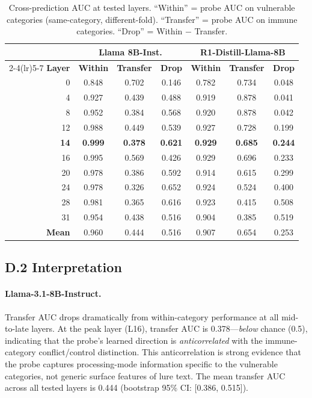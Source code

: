 \documentclass{article}
\begin{document}
\begin{table}[ht]
\centering
\caption{Cross-prediction AUC at tested layers.  ``Within'' = probe
  AUC on vulnerable categories (same-category, different-fold).
  ``Transfer'' = probe AUC on immune categories.  ``Drop'' =
  Within $-$ Transfer.}
\label{tab:cross_pred_full}
\vspace{4pt}
\small
\begin{tabular}{rcccccc}
\toprule
& \multicolumn{3}{c}{\textbf{Llama 8B-Inst.}} & \multicolumn{3}{c}{\textbf{R1-Distill-Llama-8B}} \\
\cmidrule(lr){2-4}\cmidrule(lr){5-7}
\textbf{Layer} & \textbf{Within} & \textbf{Transfer} & \textbf{Drop} & \textbf{Within} & \textbf{Transfer} & \textbf{Drop} \\
\midrule
 0 & 0.848 & 0.702 & 0.146 & 0.782 & 0.734 & 0.048 \\
 4 & 0.927 & 0.439 & 0.488 & 0.919 & 0.878 & 0.041 \\
 8 & 0.952 & 0.384 & 0.568 & 0.920 & 0.878 & 0.042 \\
12 & 0.988 & 0.449 & 0.539 & 0.927 & 0.728 & 0.199 \\
\textbf{14} & \textbf{0.999} & \textbf{0.378} & \textbf{0.621} & \textbf{0.929} & \textbf{0.685} & \textbf{0.244} \\
16 & 0.995 & 0.569 & 0.426 & 0.929 & 0.696 & 0.233 \\
20 & 0.978 & 0.386 & 0.592 & 0.914 & 0.615 & 0.299 \\
24 & 0.978 & 0.326 & 0.652 & 0.924 & 0.524 & 0.400 \\
28 & 0.981 & 0.365 & 0.616 & 0.923 & 0.415 & 0.508 \\
31 & 0.954 & 0.438 & 0.516 & 0.904 & 0.385 & 0.519 \\
\midrule
\textbf{Mean} & 0.960 & 0.444 & 0.516 & 0.907 & 0.654 & 0.253 \\
\bottomrule
\end{tabular}
\end{table}

\subsection*{D.2 Interpretation}

\paragraph{Llama-3.1-8B-Instruct.}
Transfer AUC drops dramatically from within-category performance at
all mid-to-late layers.  At the peak layer (L16), transfer AUC is
0.378---\emph{below} chance (0.5), indicating that the probe's
learned direction is \emph{anticorrelated} with the immune-category
conflict/control distinction.  This anticorrelation is strong
evidence that the probe captures processing-mode information specific
to the vulnerable categories, not generic surface features of lure
text.  The mean transfer AUC across all tested layers is 0.444
(bootstrap 95\% CI: [0.386, 0.515]).
\end{document}
